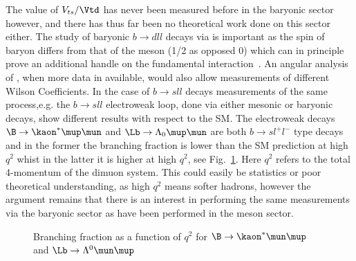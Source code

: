 The value of $V_{ts}/\Vtd$ has never been measured before in the baryonic sector however, and there has thus far been no theoretical work done on this sector either. The study of baryonic $b\to dll$ decays via \Lbpi is important as the spin of \Lb baryon differs from that of the \B meson (1/2 as opposed 0) which can in principle prove an additional handle on the fundamental interaction~\cite{Meinel}. An angular analysis of \Lbpi, when more data in available, would also allow measurements of different Wilson Coefficients. In the case of $b\to sll$ decays measurements of the same process,e.g. the $b\to sll$ electroweak loop, done via either mesonic or baryonic decays, show different results with respect to the SM. The electroweak decays $\B\to\kaon^{*}\mup\mun$ and $\Lb\to\Lambda_{0}\mup\mun$ are both $b\to sl^{+}l^{-}$ type decays and in the former the branching fraction is lower than the SM prediction at high $q^{2}$ whist in the latter it is higher at high $q^{2}$, see Fig.~\ref{fig:bfq2}. Here $q^{2}$ refers to the total 4-momentum of the dimuon system. This could easily be statistics or poor theoretical understanding, as high $q^{2}$ means softer hadrons, however the argument remains that there is an interest in performing the same measurements via the baryonic sector as have been performed in the meson sector.
\begin{figure}[!h]\def\nh{0.5\textwidth}
  \centering
  \hspace*{-2cm}  
  \caption{Branching fraction as a function of $q^{2}$ for \protect{} $\B\to\kaon^{*}\mun\mup$~\cite{LHCB-PAPER-2015-051} and \protect{} $\Lb\to\Lambda^{0}\mun\mup$~\cite{LHCB-PAPER-2015-009}}
  \label{fig:bfq2}
\end{figure}

